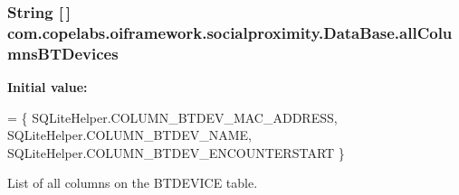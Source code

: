 \subsubsection[{all\+Columns\+B\+T\+Devices}]{\setlength{\rightskip}{0pt plus 5cm}String \mbox{[}$\,$\mbox{]} com.\+copelabs.\+oiframework.\+socialproximity.\+Data\+Base.\+all\+Columns\+B\+T\+Devices\hspace{0.3cm}{\ttfamily [private]}}\label{classcom_1_1copelabs_1_1oiframework_1_1socialproximity_1_1_data_base_aa4b93c819020054cb701c58f05596ccd}
{\bfseries Initial value\+:}
\begin{DoxyCode}
= \{ 
        SQLiteHelper.COLUMN\_BTDEV\_MAC\_ADDRESS,
        SQLiteHelper.COLUMN\_BTDEV\_NAME,
        SQLiteHelper.COLUMN\_BTDEV\_ENCOUNTERSTART
    \}
\end{DoxyCode}
List of all columns on the B\+T\+D\+E\+V\+I\+C\+E table. \hypertarget{classcom_1_1copelabs_1_1oiframework_1_1socialproximity_1_1_data_base_a28d6c47831c7bea5716b8e35f9a34e67}{}
